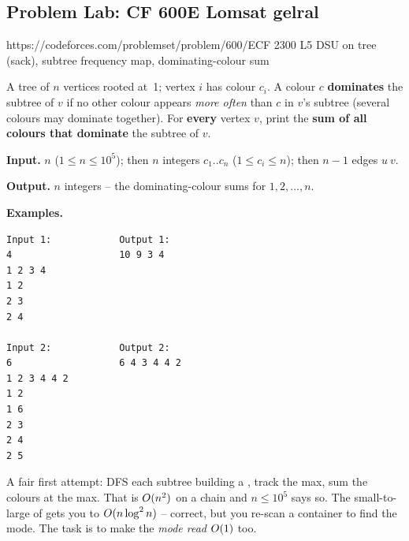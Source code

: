 \subsection{Problem Lab: CF 600E Lomsat gelral}

  {https://codeforces.com/problemset/problem/600/E}{CF 2300 L5}
  {DSU on tree (sack), subtree frequency map, dominating-colour sum}

\begin{problemstatement}
A tree of \(n\) vertices rooted at~1; vertex \(i\) has colour \(c_i\).  A colour
\(c\) \textbf{dominates} the subtree of \(v\) if no other colour appears
\emph{more often} than \(c\) in \(v\)'s subtree (several colours may dominate
together).  For \textbf{every} vertex \(v\), print the \textbf{sum of all
colours that dominate} the subtree of \(v\).

\textbf{Input.} \(n\) (\(1\le n\le10^5\)); then \(n\) integers
\(c_1..c_n\) (\(1\le c_i\le n\)); then \(n-1\) edges \(u\ v\).

\textbf{Output.} \(n\) integers -- the dominating-colour sums for
\(1,2,\dots,n\).

\textbf{Examples.}
\begin{verbatim}
Input 1:            Output 1:
4                   10 9 3 4
1 2 3 4
1 2
2 3
2 4

Input 2:            Output 2:
6                   6 4 3 4 4 2
1 2 3 4 4 2
1 2
1 6
2 3
2 4
2 5
\end{verbatim}
\end{problemstatement}

\begin{attemptgate}
A fair first attempt: DFS each subtree building a ,
track the max, sum the colours at the max.  That is \(O(n^2)\) on a chain
and \(n\le10^5\) says so.  The small-to-large of  gets you to
\(O(n\log^2 n)\) -- correct, but you re-scan a container to find the mode.
The task is to make the \emph{mode read} \(O(1)\) too.
\end{attemptgate}


